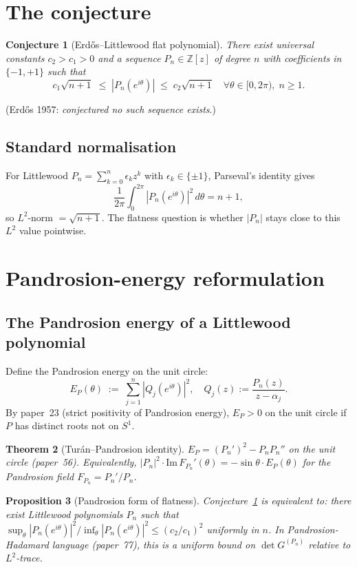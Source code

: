 \documentclass[11pt,a4paper]{article}
\newtheorem{theorem}{Theorem}[section]
\newtheorem{conjecture}[theorem]{Conjecture}
\newtheorem{proposition}[theorem]{Proposition}
\begin{document}
\section{The conjecture}\label{sec:setup}

\begin{conjecture}[Erd\H{o}s--Littlewood flat polynomial]\label{conj:EL}
There exist universal constants $c_2 > c_1 > 0$ and a sequence
$P_n \in \mathbb{Z}[z]$ of degree $n$ with coefficients in $\{-1, +1\}$ such that
\[
c_1 \sqrt{n+1} \;\le\; |P_n(e^{i\theta})| \;\le\; c_2 \sqrt{n+1}
\quad \forall \theta \in [0, 2\pi),\; n \ge 1.
\]
\end{conjecture}

\noindent (Erd\H{o}s 1957: \emph{conjectured no such sequence exists}.)

\subsection{Standard normalisation}
For Littlewood $P_n = \sum_{k=0}^n \epsilon_k z^k$ with $\epsilon_k \in \{\pm 1\}$,
Parseval's identity gives
\[
\frac{1}{2\pi}\int_0^{2\pi} |P_n(e^{i\theta})|^2\, d\theta = n + 1,
\]
so $L^2$-norm $= \sqrt{n+1}$. The flatness question is whether $|P_n|$ stays
close to this $L^2$ value pointwise.

\section{Pandrosion-energy reformulation}\label{sec:pandrosion}

\subsection{The Pandrosion energy of a Littlewood polynomial}
Define the Pandrosion energy on the unit circle:
\[
E_P(\theta) \;:=\; \sum_{j=1}^n |Q_j(e^{i\theta})|^2,
\quad Q_j(z) := \frac{P_n(z)}{z - \alpha_j}.
\]
By paper~23 (strict positivity of Pandrosion energy), $E_P > 0$ on the unit
circle if $P$ has distinct roots not on $S^1$.

\begin{theorem}[Tur\'an--Pandrosion identity]\label{thm:turan-id}
$E_P = (P_n')^2 - P_n P_n''$ on the unit circle (paper~56). Equivalently,
$|P_n|^2 \cdot \mathrm{Im}\, F_{P_n}'(\theta) = -\sin\theta \cdot E_P(\theta)$
for the Pandrosion field $F_{P_n} = P_n'/P_n$.
\end{theorem}

\begin{proposition}[Pandrosion form of flatness]\label{prop:pandrosion-flat}
Conjecture~\ref{conj:EL} is equivalent to: there exist Littlewood polynomials
$P_n$ such that $\sup_\theta |P_n(e^{i\theta})|^2 / \inf_\theta |P_n(e^{i\theta})|^2
\le (c_2/c_1)^2$ uniformly in $n$. In Pandrosion-Hadamard language (paper~77),
this is a uniform bound on $\det G^{(P_n)}$ relative to $L^2$-trace.
\end{proposition}
\end{document}
